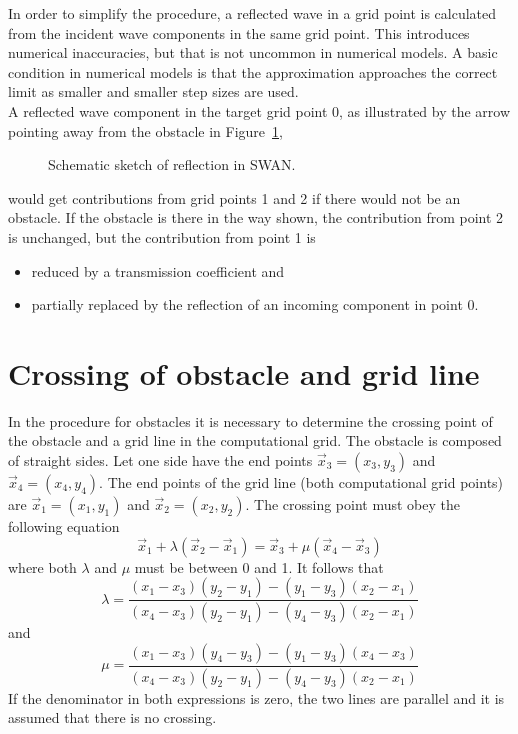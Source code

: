 \documentclass[12pt]{book}
\begin{document}
In order to simplify the procedure, a reflected wave in a grid point is calculated
from the incident wave components in the same grid point.
This introduces numerical inaccuracies, but that is not uncommon in numerical models.
A basic condition in numerical models is that the approximation approaches the correct limit
as smaller and smaller step sizes are used.
\\[2ex]
\noindent
A reflected wave component in the target grid point 0, as illustrated by the arrow pointing
away from the obstacle in Figure~\ref{fig:stencil2},
\begin{figure}[htb]
   \centerline{
              }
      \caption{Schematic sketch of reflection in SWAN.}
      \label{fig:stencil2}
\end{figure}
would get contributions from grid points 1 and 2 if there would not be an obstacle.
If the obstacle is there in the way shown, the contribution from point 2 is unchanged,
but the contribution from point 1 is
\begin{itemize}
  \item reduced by a transmission coefficient and
  \item partially replaced by the reflection of an incoming component in point 0.
\end{itemize}

\section{Crossing of obstacle and grid line}
\label{sec:cross}

In the procedure for obstacles it is necessary to determine the crossing point of the obstacle and a grid line in the computational grid.
The obstacle is composed of straight sides. Let one side have the end points $\vec{x}_3 = (x_3,y_3)$ and $\vec{x}_4 = (x_4,y_4)$.
The end points of the grid line (both computational grid points) are
$\vec{x}_1=(x_1,y_1)$ and $\vec{x}_2 = (x_2,y_2)$. The crossing point must obey the following equation
\begin{equation}
  \vec{x}_1 + \lambda (\vec{x}_2-\vec{x}_1) = \vec{x}_3 + \mu(\vec{x}_4-\vec{x}_3)
\end{equation}
where both $\lambda$ and $\mu$ must be between 0 and 1. It follows that
\begin{equation}
  \lambda = \frac{(x_1-x_3)(y_2-y_1) - (y_1-y_3)(x_2-x_1)}
                 {(x_4-x_3)(y_2-y_1) - (y_4-y_3)(x_2-x_1)}
\end{equation}
and
\begin{equation}
  \mu = \frac{(x_1-x_3)(y_4-y_3) - (y_1-y_3)(x_4-x_3)}
             {(x_4-x_3)(y_2-y_1) - (y_4-y_3)(x_2-x_1)}
\end{equation}
If the denominator in both expressions is zero, the two lines are parallel and it is assumed that there is no crossing.
\end{document}
